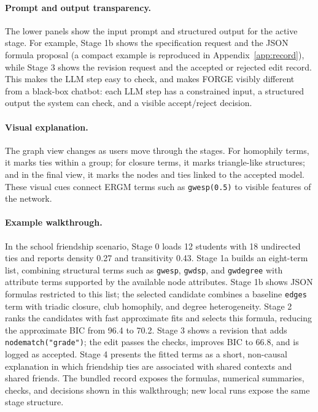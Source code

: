 \documentclass[11pt]{article}
\begin{document}
\paragraph{Prompt and output transparency.}
The lower panels show the input prompt and structured output for the active stage. For example, Stage 1b shows the specification request and the JSON formula proposal (a compact example is reproduced in Appendix~\ref{app:record}), while Stage 3 shows the revision request and the accepted or rejected edit record. This makes the LLM step easy to check, and makes FORGE visibly different from a black-box chatbot: each LLM step has a constrained input, a structured output the system can check, and a visible accept/reject decision.

\paragraph{Visual explanation.}
The graph view changes as users move through the stages. For homophily terms, it marks ties within a group; for closure terms, it marks triangle-like structures; and in the final view, it marks the nodes and ties linked to the accepted model. These visual cues connect ERGM terms such as \texttt{gwesp(0.5)} to visible features of the network.

\paragraph{Example walkthrough.}
In the school friendship scenario, Stage 0 loads 12 students with 18 undirected ties and reports density 0.27 and transitivity 0.43. Stage 1a builds an eight-term list, combining structural terms such as \texttt{gwesp}, \texttt{gwdsp}, and \texttt{gwdegree} with attribute terms supported by the available node attributes. Stage 1b shows JSON formulas restricted to this list; the selected candidate combines a baseline \texttt{edges} term with triadic closure, club homophily, and degree heterogeneity. Stage 2 ranks the candidates with fast approximate fits and selects this formula, reducing the approximate BIC from 96.4 to 70.2. Stage 3 shows a revision that adds \texttt{nodematch("grade")}; the edit passes the checks, improves BIC to 66.8, and is logged as accepted. Stage 4 presents the fitted terms as a short, non-causal explanation in which friendship ties are associated with shared contexts and shared friends. The bundled record exposes the formulas, numerical summaries, checks, and decisions shown in this walkthrough; new local runs expose the same stage structure.
\end{document}
